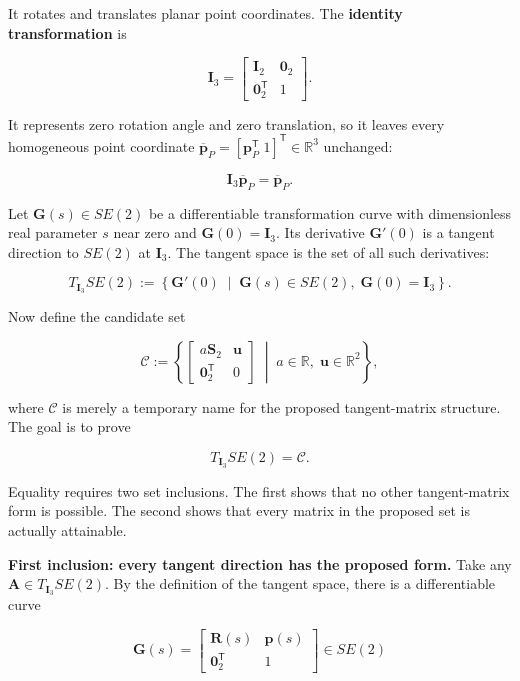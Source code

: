 \documentclass[
  australian,
  12pt,
  letterpaper,
  DIV=11,
  numbers=noendperiod,
  twoside]{scrreprt}
\begin{document}
It rotates and translates planar point coordinates. The \textbf{identity
transformation} is

\[
\mathbf I_3
=
\begin{bmatrix}
\mathbf I_2&\mathbf 0_2\\
\mathbf 0_2^\mathsf T&1
\end{bmatrix}.
\]

It represents zero rotation angle and zero translation, so it leaves
every homogeneous point coordinate
\(\overline{\mathbf p}_P=[\mathbf p_P^\mathsf T\;1]^\mathsf T\in\mathbb R^3\)
unchanged:

\[
\mathbf I_3\overline{\mathbf p}_P
=
\overline{\mathbf p}_P.
\]

Let \(\mathbf G(s)\in SE(2)\) be a differentiable transformation curve
with dimensionless real parameter \(s\) near zero and
\(\mathbf G(0)=\mathbf I_3\). Its derivative \(\mathbf G'(0)\) is a
tangent direction to \(SE(2)\) at \(\mathbf I_3\). The tangent space is
the set of all such derivatives:

\[
T_{\mathbf I_3}SE(2)
\mathrel{:=}
\left\{
\mathbf G'(0)
\;\middle|\;
\mathbf G(s)\in SE(2),\;
\mathbf G(0)=\mathbf I_3
\right\}.
\]

Now define the candidate set

\[
\mathcal C
\mathrel{:=}
\left\{
\begin{bmatrix}
a\mathbf S_2&\mathbf u\\
\mathbf 0_2^\mathsf T&0
\end{bmatrix}
\;\middle|\;
a\in\mathbb R,\;
\mathbf u\in\mathbb R^2
\right\},
\]

where \(\mathcal C\) is merely a temporary name for the proposed
tangent-matrix structure. The goal is to prove

\[
T_{\mathbf I_3}SE(2)
=
\mathcal C.
\]

Equality requires two set inclusions. The first shows that no other
tangent-matrix form is possible. The second shows that every matrix in
the proposed set is actually attainable.

\textbf{First inclusion: every tangent direction has the proposed form.}
Take any \(\mathbf A\in T_{\mathbf I_3}SE(2)\). By the definition of the
tangent space, there is a differentiable curve

\[
\mathbf G(s)
=
\begin{bmatrix}
\mathbf R(s)&\mathbf p(s)\\
\mathbf 0_2^\mathsf T&1
\end{bmatrix}
\in SE(2)
\]
\end{document}
